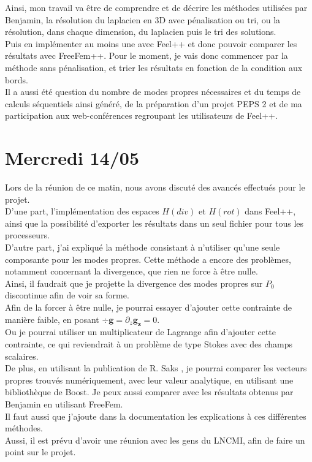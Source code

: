 Ainsi, mon travail va être de comprendre et de décrire les méthodes utilisées par Benjamin, la résolution du laplacien en 3D avec pénalisation ou tri, ou la résolution, dans chaque dimension, du laplacien puis le tri des solutions.\\
Puis en implémenter au moins une avec Feel++ et donc pouvoir comparer les résultats avec FreeFem++. Pour le moment, je vais donc commencer par la méthode sans pénalisation, et trier les résultats en fonction de la condition aux bords.\\
Il a aussi été question du nombre de modes propres nécessaires et du temps de calculs séquentiels ainsi généré, de la préparation d'un projet PEPS 2 et de ma participation aux web-conférences regroupant les utilisateurs de Feel++.

\section{Mercredi 14/05}

Lors de la réunion de ce matin, nous avons discuté des avancés effectués pour le projet.\\
D’une part,  l’implémentation des espaces $H(div)$ et $H(rot)$ dans Feel++, ainsi que la possibilité d’exporter les résultats dans un seul fichier pour tous les processeurs.\\
D’autre part, j’ai expliqué la méthode consistant à n’utiliser qu’une seule composante pour les modes propres. Cette méthode a encore des problèmes, notamment concernant la divergence, que rien ne force à être nulle.\\

Ainsi, il faudrait que je projette la divergence des modes propres sur $P_0$ discontinue afin de voir sa forme.\\
Afin de la forcer à être nulle, je pourrai essayer d’ajouter cette contrainte de manière faible, en posant $\div\bm{g} = \partial_z \bm{g_z} = 0$.\\
Ou je pourrai utiliser un multiplicateur de Lagrange afin d’ajouter cette contrainte, ce qui reviendrait à un problème de type Stokes avec des champs scalaires.\\
De plus, en utilisant la publication de R. Saks \cite{Saks2005}, je pourrai comparer les vecteurs propres trouvés numériquement, avec leur valeur analytique, en utilisant une bibliothèque de Boost. Je peux aussi comparer avec les résultats obtenus par Benjamin en utilisant FreeFem.\\
Il faut aussi que j’ajoute dans la documentation les explications à ces différentes méthodes.\\
Aussi, il est prévu d’avoir une réunion avec les gens du LNCMI, afin de faire un point sur le projet.



